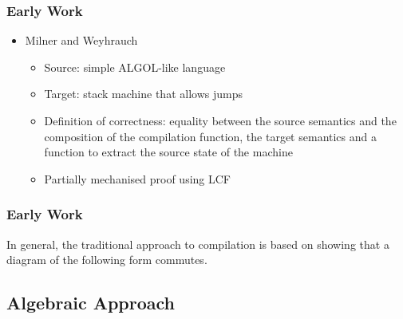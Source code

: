 \documentclass{beamer}
\newcommand{\footmake}[1]{
\ifthenelse{\equal{#1}{}}%
	{}%
	{\footnotetext{#1}}%
}
\newenvironment{slide}[2][fragile,environment=slide]
{\begin{frame}[#1]
	\frametitle{#2}\begin{refsegment}}
{\footmake{\printbibliography[segment=\therefsegment]}\end{refsegment}\end{frame}}
\begin{document}
\begin{slide}{Early Work}
  \begin{itemize}
  \item Milner and Weyhrauch\cite{milner1972}
    \begin{itemize}
    \item Source: simple ALGOL-like language
    \item Target: stack machine that allows jumps
    \item Definition of correctness: equality between the source semantics and the composition of the compilation function, the target semantics and a function to extract the source state of the machine
    \item Partially mechanised proof using LCF
    \end{itemize}
  \end{itemize}
\end{slide}

\begin{slide}{Early Work}
  In general, the traditional approach to compilation is based on showing that a diagram of the following form commutes\cite{morris1973, thatcher1979}.
  \begin{center}
  \end{center}
\end{slide}

\subsection{Algebraic Approach}
\end{document}
